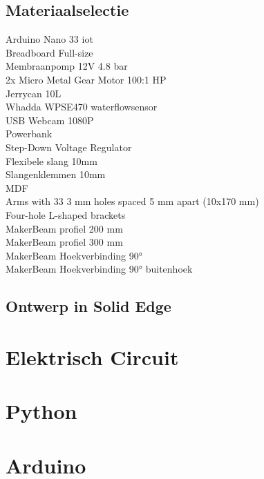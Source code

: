 \documentclass[kulak]{kulakarticle} %
\begin{document}
\subsection{Materiaalselectie}
Arduino Nano 33 iot \\
Breadboard Full-size \\
Membraanpomp 12V 4.8 bar \\
2x Micro Metal Gear Motor 100:1 HP \\
Jerrycan 10L\\
Whadda WPSE470 waterflowsensor \\
USB Webcam 1080P \\
Powerbank\\
Step-Down Voltage Regulator \\
Flexibele slang 10mm \\
Slangenklemmen 10mm \\
MDF \\
Arms with 33 3 mm holes spaced 5 mm apart (10x170 mm) \\
Four-hole L-shaped brackets \\
MakerBeam profiel 200 mm \\
MakerBeam profiel 300 mm \\
MakerBeam Hoekverbinding 90° \\
MakerBeam Hoekverbinding 90° buitenhoek \\


\subsection{Ontwerp in Solid Edge}


\section{Elektrisch Circuit}


\section{Python}


\section{Arduino}
\end{document}
